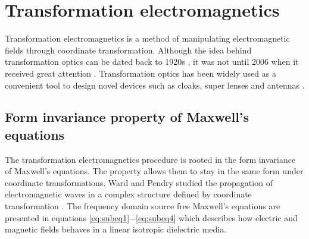 


\section{Transformation electromagnetics} \label{sec:TO}

Transformation electromagnetics is a method of manipulating electromagnetic fields through coordinate transformation. Although the idea behind transformation optics can be dated back to 1920s \cite{gordon1923}\cite{dyson1920}, it was not until 2006 when it received great attention \cite{Pendry2006}\cite{Leonhardt2009}. Transformation optics has been widely used as a convenient tool to design novel devices such as cloaks, super lenses \cite{Pendry2000} and antennas \cite{Leonhardt2008, Lier2011, Luo2009, Popa2009, Schmiele2010, Tichit2009}.

\subsection{Form invariance property of Maxwell's equations}
The transformation electromagnetics procedure is rooted in the form invariance of Maxwell's equations. The property allows them to stay in the same form under coordinate transformations. Ward and Pendry studied the propagation of electromagnetic waves in a complex structure defined by coordinate transformation \cite{Ward1996}. The frequency domain source free Maxwell's equations are presented in equations \ref{eq:subeq1}$-$\ref{eq:subeq4} which describes how electric and magnetic fields behaves in a linear isotropic dielectric media. 

